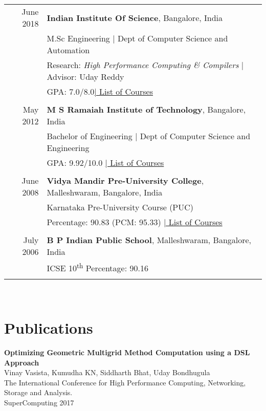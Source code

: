 \documentclass[a4paper,10pt]{article} %
\begin{document}
\begin{tabular}{rp{13cm}}
June 2018 & \textbf{Indian Institute Of Science}, Bangalore, India\\
& M.Sc Engineering | Dept of Computer Science and Automation\\
& Research: \small\emph{High Performance Computing \& Compilers} | Advisor: Uday Reddy\\
&\normalsize GPA: 7.0/8.0\hyperlink{iisc}{\hfill | \footnotesize List of Courses}\\
&\\


May 2012 & \textbf{M S Ramaiah Institute of Technology}, Bangalore, India\\
& Bachelor of Engineering | Dept of Computer Science and Engineering \\
&\normalsize GPA: 9.92/10.0 \hyperlink{msrit}{\hfill| \footnotesize List of Courses}\\
&\\


June 2008 & \textbf{Vidya Mandir Pre-University College}, Malleshwaram, Bangalore, India\\
& Karnataka Pre-University Course (PUC) \\
&\normalsize Percentage: 90.83 (PCM: 95.33) \hyperlink{hs}{\hfill| 
\footnotesize List of Courses}\\
&\\


July 2006 & \textbf{B P Indian Public School}, Malleshwaram, Bangalore, India\\
& ICSE 10\textsuperscript{th} \normalsize Percentage: 90.16 \\
&\\
\end{tabular}
\\
\section{Publications}
\textbf{Optimizing Geometric Multigrid Method Computation using a DSL Approach}\\
\small{Vinay Vasista, Kumudha KN, Siddharth Bhat, Uday Bondhugula} \\
\small{The International Conference for High Performance Computing, Networking, Storage and Analysis. \\ SuperComputing 2017} \\
\end{document}
